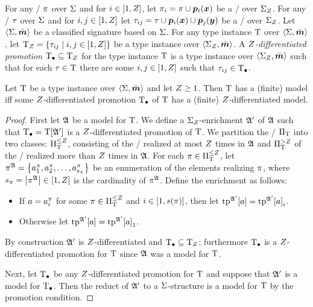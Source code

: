 For any \onetype/ $\pi$ over $\mathrm{\Sigma}$ and for $i\in[1,Z]$,
let ${\pi}_{i} = \pi\cup\bm{p}_{i}(\bm{x})$ be a \onetype/ over ${\mathrm{\Sigma}}_{Z}$.
For any \twotype/ $\tau$ over $\mathrm{\Sigma}$ and for $i,j\in[1,Z]$
let ${\tau}_{ij} = \tau\cup\bm{p}_{i}(\bm{x})\cup\bm{p}_{j}(\bm{y})$ be a \twotype/ over
${\mathrm{\Sigma}}_{Z}$.
Let $\left\langle \mathrm{\Sigma},\bar{\bm{m}} \right\rangle$ be a classified signature based on $\mathrm{\Sigma}$.
For any type instance $\mathrm{T}$ over $\left\langle \mathrm{\Sigma},\bar{\bm{m}} \right\rangle$, let ${\mathrm{T}}_{Z} =
\left\{{\tau}_{ij}\mathrel{}\middle|\mathrel{}i,j\in[1,Z]\right\}$ be a type instance over
$\left\langle {\mathrm{\Sigma}}_{Z},\bar{\bm{m}} \right\rangle$.
A \emph{$Z$-differentiated promotion} $\mathrm{T}_{\bullet}\subseteq{\mathrm{T}}_{Z}$ for the type
instance $\mathrm{T}$ is a type instance over $\left\langle {\mathrm{\Sigma}}_{Z},\bar{\bm{m}} \right\rangle$ such that for
each $\tau\in\mathrm{T}$ there are some $i,j\in[1,Z]$ such that
${\tau}_{ij}\in\mathrm{T}_{\bullet}$.

\begin{remark}\label{rem:z-diff}
Let $\mathrm{T}$ be a type instance over $\left\langle \mathrm{\Sigma},\bar{\bm{m}} \right\rangle$ and let $Z\geq1$.
Then $\mathrm{T}$ has a (finite) model
iff some $Z$-differentiated promotion $\mathrm{T}_{\bullet}$ of $\mathrm{T}$ has a (finite)
$Z$-differentiated model.
\end{remark}
\begin{proof}
First let $\mathfrak{A}$ be a model for $\mathrm{T}$.
We define a ${\mathrm{\Sigma}}_{Z}$-enrichment $\mathfrak{A'}$ of $\mathfrak{A}$ such that $\mathrm{T}_{\bullet} =
\mathrm{T}[\mathfrak{A'}]$ is a $Z$-differentiated promotion of $\mathrm{T}$.
We partition the \onetypes/ ${\Pi}_{\mathrm{T}}$ into two classes: ${\Pi}_{\mathrm{T}}^{\leq Z}$,
consisting of the \onetypes/ realized at most $Z$ times in $\mathfrak{A}$ and
${\Pi}_{\mathrm{T}}^{>Z}$ of the \onetypes/ realized more than $Z$ times in $\mathfrak{A}$.
For each $\pi\in{\Pi}_{\mathrm{T}}^{\leq Z}$, let
$\pi^{\mathfrak{A}} = \left\{a_1^\pi,a_2^\pi,\dots,a_{s_\pi}^\pi\right\}$ be an
enumeration of the elements realizing $\pi$, where
$s_\pi=\left|\pi^{\mathfrak{A}}\right|\in[1,Z]$ is the cardinality of $\pi^{\mathfrak{A}}$.
Define the enrichment as follows:
\begin{itemize}
  \item If $a = a_i^\pi$ for some $\pi\in{\Pi}_{\mathrm{T}}^{\leq Z}$ and
  $i\in[1,s(\pi)]$, then let $\operatorname{tp}^{\mathfrak{A'}}[a] = {\operatorname{tp}^{\mathfrak{A'}}[a]}_{i}$.
  \item Otherwise let $\operatorname{tp}^{\mathfrak{A'}}[a] = {\operatorname{tp}^{\mathfrak{A'}}[a]}_{1}$.
\end{itemize}
By construction $\mathfrak{A'}$ is $Z$-differentiated and $\mathrm{T}_{\bullet}\subseteq{\mathrm{T}}_{Z}$;
furthermore $\mathrm{T}_{\bullet}$ is a $Z$-differentiated promotion for $\mathrm{T}$ since $\mathfrak{A}$
was a model for $\mathrm{T}$.

Next, let $\mathrm{T}_{\bullet}$ be any $Z$-differentiated promotion for $\mathrm{T}$ and suppose
that $\mathfrak{A'}$ is a model for $\mathrm{T}_{\bullet}$. Then the reduct of $\mathfrak{A'}$ to a
$\mathrm{\Sigma}$-structure is a model for $\mathrm{T}$ by the promotion condition.
\end{proof}


